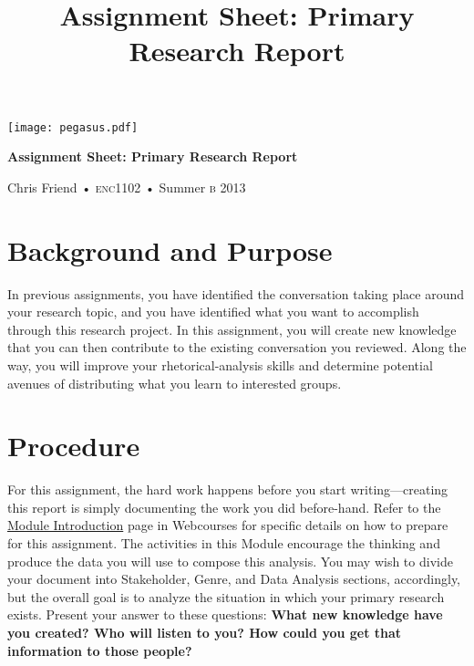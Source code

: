 \documentclass[10pt,oneside]{amsart}	%
\title[Primary Research Report]{Assignment Sheet: Primary Research Report}
\begin{document}
%
\thispagestyle{empty}

\vspace{-2in}
\begin{center}
\huge
\texttt{[image: pegasus.pdf]}

\textbf{Assignment Sheet: Primary Research Report}

{\normalsize Chris Friend • \textsc{enc1102} • Summer \textsc{b} 2013}
\end{center}
\vspace{1.5\baselineskip}

\section{Background and Purpose} %
\label{sec:background}
In previous assignments, you have identified the conversation taking place around your research topic, and you have identified what you want to accomplish through this research project. In this assignment, you will create new knowledge that you can then contribute to the existing conversation you reviewed. Along the way, you will improve your rhetorical-analysis skills and determine potential avenues of distributing what you learn to interested groups.

\section{Procedure} %
\label{sec:procedure}
For this assignment, the hard work happens before you start writing---creating this report is simply documenting the work you did before-hand. Refer to the \href{https://webcourses.ucf.edu/courses/982699/wiki/primary-research-module-4-intro}{Module Introduction} page in Webcourses for specific details on how to prepare for this assignment. The activities in this Module encourage the thinking and produce the data you will use to compose this analysis. You may wish to divide your document into Stakeholder, Genre, and Data Analysis sections, accordingly, but the overall goal is to analyze the situation in which your primary research exists. Present your answer to these questions: \textbf{What new knowledge have you created? Who will listen to you? How could you get that information to those people?}
\end{document}
